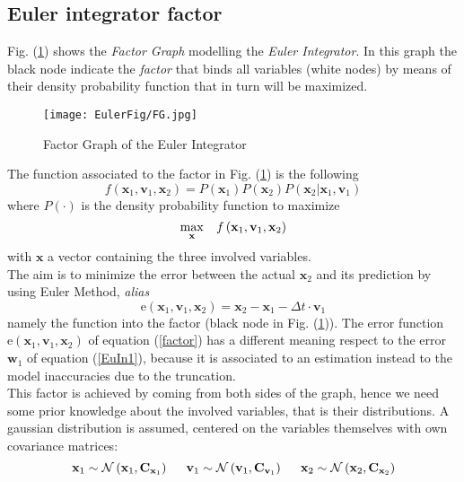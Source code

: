 \documentclass[12pt,a4paper]{book}
\begin{document}
\subsection*{Euler integrator factor}
Fig. (\ref{FG}) shows the \textit{Factor Graph} modelling the \textit{Euler Integrator}. In this graph the black node indicate the \textit{factor} that binds all variables (white nodes) by means of their density probability function that in turn will be maximized.
\begin{figure}[hbtp]
\centering
\texttt{[image: EulerFig/FG.jpg]}
\caption{Factor Graph of the Euler Integrator}
\label{FG}
\end{figure}

The function associated to the factor in Fig. (\ref{FG}) is the following
\begin{equation}
f\left(\mathbf{x}_1,\mathbf{v}_1,\mathbf{x}_2\right)=P\left(\mathbf{x}_1\right)P\left(\mathbf{x}_2\right)P\left(\mathbf{x}_2|\mathbf{x}_1,\mathbf{v}_1\right)
\label{fFG}
\end{equation}
where $P(\cdot )$ is the density probability function to maximize
\begin{equation}
\max_{\mathbf{x}} \hspace*{0.3cm} f\left(\mathbf{x}_1,\mathbf{v}_1,\mathbf{x}_2\right)
\end{equation}
with $\mathbf{x}$ a vector containing the three involved variables. 
\\The aim is to minimize the error between the actual $\mathbf{x}_2$ and its prediction by using Euler Method, \textit{alias}
\begin{equation}
\text{e}\left(\mathbf{x}_1,\mathbf{v}_1,\mathbf{x}_2\right)= \mathbf{x}_2 - \mathbf{x}_1 - \Delta t \cdot \mathbf{v}_1
\label{factor}
\end{equation}
namely the function into the factor (black node in Fig. (\ref{FG})). The error function $\text{e}\left(\mathbf{x}_1,\mathbf{v}_1,\mathbf{x}_2\right)$ of equation (\ref{factor}) has a different meaning respect to the error $\mathbf{w}_1$ of equation (\ref{EuIn1}), because it is associated to an estimation instead to the model inaccuracies due to the truncation. 
\\This factor is achieved by coming from both sides of the graph, hence we need some prior knowledge about the involved variables, that is their distributions. A gaussian distribution is assumed, centered on the variables themselves with own covariance matrices:
\begin{equation}
\mathbf{x}_1 \sim \mathcal{N}\left(\mathbf{x}_1,\mathbf{C}_{\mathbf{x}_1}\right) \hspace*{0.5cm}
\mathbf{v}_1 \sim \mathcal{N}\left(\mathbf{v}_1,\mathbf{C}_{\mathbf{v}_1}\right) \hspace*{0.5cm}
\mathbf{x}_2 \sim \mathcal{N}\left(\mathbf{x}_2,\mathbf{C}_{\mathbf{x}_2}\right)
\label{VarStat}
\end{equation}
\end{document}
